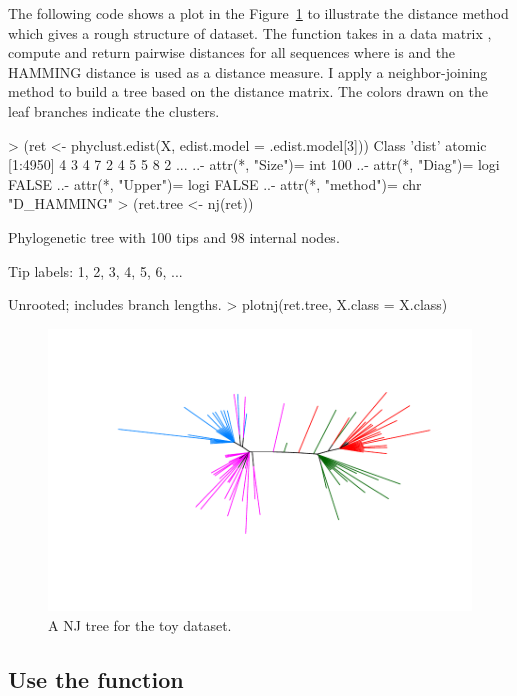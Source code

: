 The following code shows a plot in the Figure~\ref{fig:toynj}
to illustrate the distance method which gives a rough structure
of dataset.
The  function takes in a data
matrix , compute and return pairwise distances for all sequences
where  is  and the HAMMING distance
is used as a distance measure.
I apply a neighbor-joining method to build a tree based
on the distance matrix. The colors drawn on the leaf branches indicate
the clusters.
\begin{Code}
> (ret <- phyclust.edist(X, edist.model = .edist.model[3]))
Class 'dist'  atomic [1:4950] 4 3 4 7 2 4 5 5 8 2 ...
  ..- attr(*, "Size")= int 100
  ..- attr(*, "Diag")= logi FALSE
  ..- attr(*, "Upper")= logi FALSE
  ..- attr(*, "method")= chr "D_HAMMING"
> (ret.tree <- nj(ret))

Phylogenetic tree with 100 tips and 98 internal nodes.

Tip labels:
        1, 2, 3, 4, 5, 6, ...

Unrooted; includes branch lengths.
> plotnj(ret.tree, X.class = X.class)
\end{Code}
\begin{figure}[h]
\begin{center}
\includegraphics[width=5.0in]{./phyclust-graph/toynj}
\caption{A NJ tree for the toy dataset.}
\label{fig:toynj}
\end{center}
\end{figure}


\subsection[Use the phyclust() function]{Use the  function}
\label{sec:phyclust}

